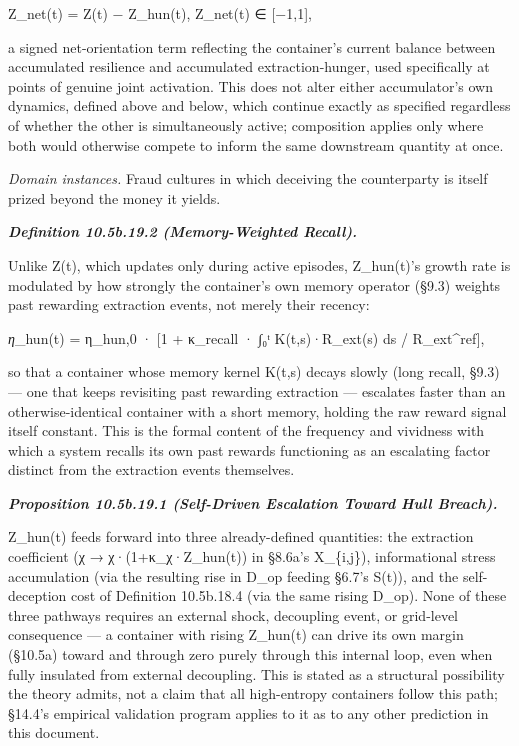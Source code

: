\documentclass[
]{article}
\begin{document}
Z\_net(t) = Z(t) − Z\_hun(t), Z\_net(t) ∈ {[}−1,1{]},

a signed net-orientation term reflecting the container's current balance
between accumulated resilience and accumulated extraction-hunger, used
specifically at points of genuine joint activation. This does not alter
either accumulator's own dynamics, defined above and below, which
continue exactly as specified regardless of whether the other is
simultaneously active; composition applies only where both would
otherwise compete to inform the same downstream quantity at once.

\emph{Domain instances.} Fraud cultures in which deceiving the
counterparty is itself prized beyond the money it yields.

\emph{\textbf{Definition 10.5b.19.2 (Memory-Weighted Recall).}}

Unlike Z(t), which updates only during active episodes, Z\_hun(t)'s
growth rate is modulated by how strongly the container's own memory
operator (§9.3) weights past rewarding extraction events, not merely
their recency:

\emph{η}\_hun(t) = η\_hun,0 · {[}1 + κ\_recall · ∫₀ᵗ K(t,s)·R\_ext(s) ds
/ R\_ext\^{}ref{]},

so that a container whose memory kernel K(t,s) decays slowly (long
recall, §9.3) --- one that keeps revisiting past rewarding extraction
--- escalates faster than an otherwise-identical container with a short
memory, holding the raw reward signal itself constant. This is the
formal content of the frequency and vividness with which a system
recalls its own past rewards functioning as an escalating factor
distinct from the extraction events themselves.

\emph{\textbf{Proposition 10.5b.19.1 (Self-Driven Escalation Toward Hull
Breach).}}

Z\_hun(t) feeds forward into three already-defined quantities: the
extraction coefficient (χ → χ·(1+κ\_χ·Z\_hun(t)) in §8.6a's X\_\{i,j\}),
informational stress accumulation (via the resulting rise in D\_op
feeding §6.7's S(t)), and the self-deception cost of Definition
10.5b.18.4 (via the same rising D\_op). None of these three pathways
requires an external shock, decoupling event, or grid-level consequence
--- a container with rising Z\_hun(t) can drive its own margin (§10.5a)
toward and through zero purely through this internal loop, even when
fully insulated from external decoupling. This is stated as a structural
possibility the theory admits, not a claim that all high-entropy
containers follow this path; §14.4's empirical validation program
applies to it as to any other prediction in this document.
\end{document}
